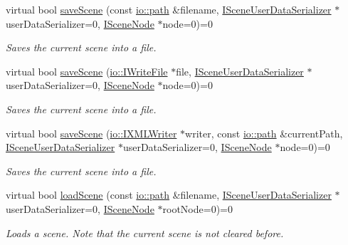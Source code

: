 \begin{DoxyCompactItemize}
virtual bool \hyperlink{classirr_1_1scene_1_1ISceneManager_a6dd059e96ff4f7233b7ba1ed7e39c337}{save\+Scene} (const \hyperlink{namespaceirr_1_1io_a6468281622ce3a1c46b72e19f32dded5}{io\+::path} \&filename, \hyperlink{classirr_1_1scene_1_1ISceneUserDataSerializer}{I\+Scene\+User\+Data\+Serializer} $\ast$user\+Data\+Serializer=0, \hyperlink{classirr_1_1scene_1_1ISceneNode}{I\+Scene\+Node} $\ast$node=0)=0
\begin{DoxyCompactList}\small\item\em Saves the current scene into a file. \end{DoxyCompactList}\item 
virtual bool \hyperlink{classirr_1_1scene_1_1ISceneManager_a5de4b5131186f3bcd8b0213f68e4a9ce}{save\+Scene} (\hyperlink{classirr_1_1io_1_1IWriteFile}{io\+::\+I\+Write\+File} $\ast$file, \hyperlink{classirr_1_1scene_1_1ISceneUserDataSerializer}{I\+Scene\+User\+Data\+Serializer} $\ast$user\+Data\+Serializer=0, \hyperlink{classirr_1_1scene_1_1ISceneNode}{I\+Scene\+Node} $\ast$node=0)=0
\begin{DoxyCompactList}\small\item\em Saves the current scene into a file. \end{DoxyCompactList}\item 
virtual bool \hyperlink{classirr_1_1scene_1_1ISceneManager_a824daa42c8bcf5c5eff159a56052000d}{save\+Scene} (\hyperlink{classirr_1_1io_1_1IXMLWriter}{io\+::\+I\+X\+M\+L\+Writer} $\ast$writer, const \hyperlink{namespaceirr_1_1io_a6468281622ce3a1c46b72e19f32dded5}{io\+::path} \&current\+Path, \hyperlink{classirr_1_1scene_1_1ISceneUserDataSerializer}{I\+Scene\+User\+Data\+Serializer} $\ast$user\+Data\+Serializer=0, \hyperlink{classirr_1_1scene_1_1ISceneNode}{I\+Scene\+Node} $\ast$node=0)=0
\begin{DoxyCompactList}\small\item\em Saves the current scene into a file. \end{DoxyCompactList}\item 
virtual bool \hyperlink{classirr_1_1scene_1_1ISceneManager_aa7641dd33e84fca7946ed17047349a3e}{load\+Scene} (const \hyperlink{namespaceirr_1_1io_a6468281622ce3a1c46b72e19f32dded5}{io\+::path} \&filename, \hyperlink{classirr_1_1scene_1_1ISceneUserDataSerializer}{I\+Scene\+User\+Data\+Serializer} $\ast$user\+Data\+Serializer=0, \hyperlink{classirr_1_1scene_1_1ISceneNode}{I\+Scene\+Node} $\ast$root\+Node=0)=0
\begin{DoxyCompactList}\small\item\em Loads a scene. Note that the current scene is not cleared before. \end{DoxyCompactList}\item 

\end{DoxyCompactItemize}
